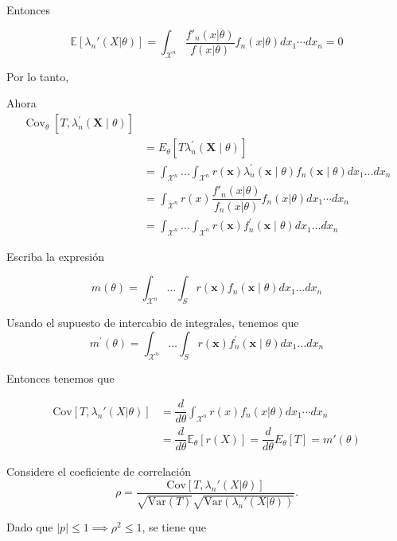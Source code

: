 \documentclass[
  12pt,
]{book}
\begin{document}
Entonces

\[\mathbb E[\lambda_n'(X|\theta)] = \int_{\mathcal X^n}\dfrac{f'_n(x|\theta)}{f(x|\theta)} f_{n}(x\vert \theta)dx_1\cdots dx_n = 0\]

Por lo tanto,

Ahora
\begin{align*}
\operatorname{Cov}_{\theta}\left[T, \lambda_{n}^{\prime}(\boldsymbol{X} \mid
\theta)\right] \\
&=E_{\theta}\left[T \lambda_{n}^{\prime}(\boldsymbol{X} \mid \theta)\right] \\
&=\int_{\mathcal{X}^n} \ldots \int_{\mathcal{X}^n} r(\boldsymbol{x}) \lambda_{n}^{\prime}(\boldsymbol{x} \mid \theta) f_{n}(\boldsymbol{x} \mid \theta) d x_{1} \ldots d x_{n} \\
& =\int_{\mathcal X^n}r(x)\dfrac{f'_n(x|\theta)}{f_n(x|\theta)}f_n(x|\theta)dx_1\cdots dx_n\\
&=\int_{\mathcal{X}^n} \ldots \int_{\mathcal{X}^n} r(\boldsymbol{x}) f_{n}^{\prime}(\boldsymbol{x} \mid \theta) d x_{1} \ldots d x_{n}
\end{align*}

Escriba la expresión

\begin{equation*}
m(\theta)=\int_{\mathcal{X}^n} \ldots \int_{S} r(\boldsymbol{x}) f_{n}(\boldsymbol{x} \mid \theta) d x_{1} \ldots d x_{n}
\end{equation*}

Usando el supuesto de intercabio de integrales, tenemos que
\begin{equation*}
m^{\prime}(\theta)=\int_{\mathcal{X}^n} \ldots \int_{S} r(\boldsymbol{x}) f_{n}^{\prime}(\boldsymbol{x} \mid \theta) d x_{1} \ldots d x_{n}
\end{equation*}

Entonces tenemos que

\begin{align*}
\text{Cov}[T,\lambda_n'(X|\theta)] 
& =  \dfrac d{d\theta}\int_{\mathcal X^n}r(x)f_n(x|\theta)dx_1\cdots dx_n\\
& = \dfrac{d}{d\theta}\mathbb E_\theta[r(X)] = \dfrac{d}{d\theta}E_\theta[T] = m'(\theta)
\end{align*}

Considere el coeficiente de correlación
\[\rho = \dfrac{\text{Cov}[T,\lambda_n'(X|\theta)] }{\sqrt{\text{Var}(T)}\sqrt{\text{Var}(\lambda_n'(X|\theta))}}.\]

Dado que \(|p|\leq 1 \implies \rho^2 \leq 1\), se tiene que
\end{document}
